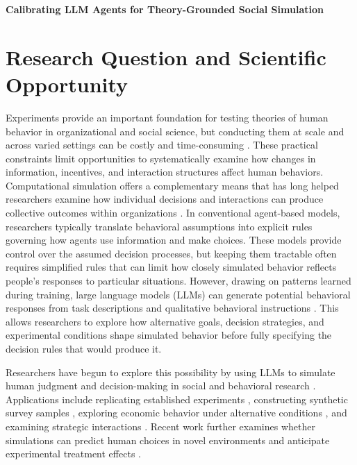 \documentclass[12pt,letterpaper]{article}
\begin{document}
\begin{center}

{\Large\bfseries Calibrating LLM Agents for Theory-Grounded Social Simulation}
\end{center}

\section*{\normalsize Research Question and Scientific Opportunity}

Experiments provide an important foundation for testing theories of human behavior in organizational and social science, but conducting them at scale and across varied settings can be costly and time-consuming \citep{aher2023,ashokkumar2026}. These practical constraints limit opportunities to systematically examine how changes in information, incentives, and interaction structures affect human behaviors. Computational simulation offers a complementary means that has long helped researchers examine how individual decisions and interactions can produce collective outcomes within organizations \citep{davis2007}. In conventional agent-based models, researchers typically translate behavioral assumptions into explicit rules governing how agents use information and make choices. These models provide control over the assumed decision processes, but keeping them tractable often requires simplified rules that can limit how closely simulated behavior reflects people’s responses to particular situations. However, drawing on patterns learned during training, large language models (LLMs) can generate potential behavioral responses from task descriptions and qualitative behavioral instructions \citep{manning2026}. This allows researchers to explore how alternative goals, decision strategies, and experimental conditions shape simulated behavior before fully specifying the decision rules that would produce it. 

Researchers have begun to explore this possibility by using LLMs to simulate human judgment and decision-making in social and behavioral research \citep{aher2023,argyle2023,filippas2024}. Applications include replicating established experiments \citep{aher2023}, constructing synthetic survey samples \citep{argyle2023}, exploring economic behavior under alternative conditions \citep{filippas2024}, and examining strategic interactions \citep{tranchero2026}. Recent work further examines whether simulations can predict human choices in novel environments and anticipate experimental treatment effects \citep{manning2026,ashokkumar2026}.
\end{document}
